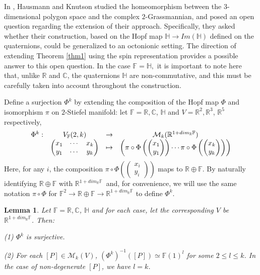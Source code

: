 \documentclass[a4paper]{article}%
\newtheorem{lemma}[theorem]{Lemma}
\begin{document}
In \cite{HK}, Hausmann and Knutson studied the homeomorphism between the
$3$-dimensional polygon space and the complex $2$-Grassmannian, and posed an
open question regarding the extension of their approach. Specifically, they
asked whether their construction, based on the Hopf map $\mathbb{H}\rightarrow
Im(\mathbb{H})$ defined on the quaternions, could be generalized to an
octonionic setting. The direction of extending Theorem \ref{thm1} using the
spin representation provides a possible answer to this open question. In the
case $\mathbb{F}=\mathbb{H},$ it is important to note here that, unlike
$\mathbb{R}$ and $\mathbb{C}$, the quaternions $\mathbb{H}$ are
non-commutative, and this must be carefully taken into account throughout the construction.

Define a surjection $\Phi^{k}$ by extending the composition of the Hopf map
$\Phi$ and isomorphism $\pi$ on $2$-Stiefel manifold: let $\mathbb{F}%
=\mathbb{R},\mathbb{C}$, $\mathbb{H}$ and $V=\mathbb{R}^{2},\mathbb{R}^{3}$,
$\mathbb{R}^{5}$ respectively,%
\[%
\begin{array}
[c]{cccc}%
\Phi^{k}: & V_{\mathbb{F}}(2,k) & \rightarrow & \mathcal{M}_{k}(\mathbb{R}%
^{1+dim_{\mathbb{R}}\mathbb{F}})\\
&
\begin{pmatrix}
x_{1} & \cdots & x_{k}\\
y_{1} & \cdots & y_{k}%
\end{pmatrix}
& \mapsto & \left(  \pi\circ\Phi\left(
\begin{pmatrix}
x_{1}\\
y_{1}%
\end{pmatrix}
\right)  \cdots\pi\circ\Phi\left(
\begin{pmatrix}
x_{k}\\
y_{k}%
\end{pmatrix}
\right)  \right)
\end{array}
\]
Here, for any $i$, the composition $\pi\circ\Phi\left(
\begin{pmatrix}
x_{i}\\
y_{i}%
\end{pmatrix}
\right)  $ maps to $\mathbb{R}\oplus\mathbb{F}$. By naturally identifying
$\mathbb{R}\oplus\mathbb{F}$ with $\mathbb{R}^{1+dim_{\mathbb{R}}\mathbb{F}}%
$\ and, for convenience, we will use the same notation $\pi\circ\Phi$ for
$\mathbb{F}^{2}\rightarrow\mathbb{R}\oplus\mathbb{F}\rightarrow\mathbb{R}%
^{1+dim_{\mathbb{R}}\mathbb{F}}$ to define $\Phi^{k}$.

\begin{lemma}
\label{Phik} Let $\mathbb{F}=\mathbb{R},\mathbb{C}$, $\mathbb{H}$ and for each
case, let the corresponding $V$ be $\mathbb{R}^{1+dim_{\mathbb{R}}\mathbb{F}}%
$. Then:

(1) $\Phi^{k}$ is surjective.

(2) For each $[P]\in\mathcal{M}_{k}(V)$, $(\Phi^{k})^{-1}([P])\simeq
\mathbb{F}(1)^{l}$ for some $2\leq l\leq k$. In the case of non-degenerate
$[P]$, we have $l=k$.
\end{lemma}
\end{document}
